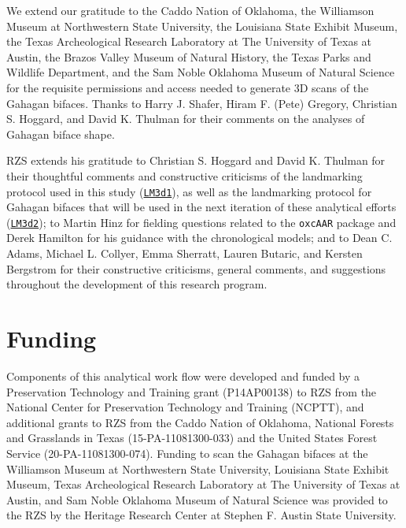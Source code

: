 \documentclass[]{interact}
\theoremstyle{plain}%
\theoremstyle{definition}
\theoremstyle{remark}
\begin{document}
We extend our gratitude to the Caddo Nation of Oklahoma, the Williamson
Museum at Northwestern State University, the Louisiana State Exhibit
Museum, the Texas Archeological Research Laboratory at The University of
Texas at Austin, the Brazos Valley Museum of Natural History, the Texas
Parks and Wildlife Department, and the Sam Noble Oklahoma Museum of
Natural Science for the requisite permissions and access needed to
generate 3D scans of the Gahagan bifaces. Thanks to Harry J. Shafer,
Hiram F. (Pete) Gregory, Christian S. Hoggard, and David K. Thulman for
their comments on the analyses of Gahagan biface shape.

RZS extends his gratitude to Christian S. Hoggard and David K. Thulman
for their thoughtful comments and constructive criticisms of the
landmarking protocol used in this study
(\href{https://github.com/aksel-blaise/gahaganmorph2/blob/master/analysis/landmarking-protocol.md}{\texttt{LM3d1}}),
as well as the landmarking protocol for Gahagan bifaces that will be
used in the next iteration of these analytical efforts
(\href{https://seldenlab.github.io/gahaganmorph.3/landmarking-protocol-3d2.html}{\texttt{LM3d2}});
to Martin Hinz for fielding questions related to the \texttt{oxcAAR}
package and Derek Hamilton for his guidance with the chronological
models; and to Dean C. Adams, Michael L. Collyer, Emma Sherratt, Lauren
Butaric, and Kersten Bergstrom for their constructive criticisms,
general comments, and suggestions throughout the development of this
research program.

\hypertarget{funding}{%
\section*{Funding}\label{funding}}

Components of this analytical work flow were developed and funded by a
Preservation Technology and Training grant (P14AP00138) to RZS from the
National Center for Preservation Technology and Training (NCPTT), and
additional grants to RZS from the Caddo Nation of Oklahoma, National
Forests and Grasslands in Texas (15-PA-11081300-033) and the United
States Forest Service (20-PA-11081300-074). Funding to scan the Gahagan
bifaces at the Williamson Museum at Northwestern State University,
Louisiana State Exhibit Museum, Texas Archeological Research Laboratory
at The University of Texas at Austin, and Sam Noble Oklahoma Museum of
Natural Science was provided to the RZS by the Heritage Research Center
at Stephen F. Austin State University.
\end{document}
